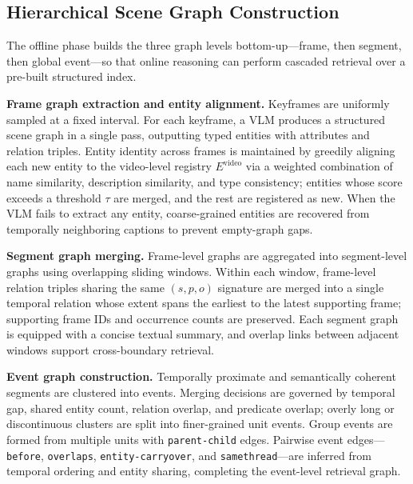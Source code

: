 \documentclass[sigconf, screen, review, anonymous]{acmart}
\begin{document}
\subsection{Hierarchical Scene Graph Construction}
\label{sec:construction}

The offline phase builds the three graph levels bottom-up---frame, then
segment, then global event---so that online reasoning can perform cascaded
retrieval over a pre-built structured index.

\textbf{Frame graph extraction and entity alignment.}\quad
Keyframes are uniformly sampled at a fixed interval.  For each keyframe, a
VLM produces a structured scene graph in a single pass, outputting typed
entities with attributes and relation triples.  Entity identity across
frames is maintained by greedily aligning each new entity to the
video-level registry $E^{\text{video}}$ via a weighted combination of name
similarity, description similarity, and type consistency; entities whose
score exceeds a threshold $\tau$ are merged, and the rest are registered as
new.  When the VLM fails to extract any entity, coarse-grained entities
are recovered from temporally neighboring captions to prevent empty-graph
gaps.

\textbf{Segment graph merging.}\quad
Frame-level graphs are aggregated into segment-level graphs using
overlapping sliding windows.  Within each window, frame-level relation
triples sharing the same $(s, p, o)$ signature are merged into a single
temporal relation whose extent spans the earliest to the latest supporting
frame; supporting frame IDs and occurrence counts are preserved.  Each
segment graph is equipped with a concise textual summary, and overlap links
between adjacent windows support cross-boundary retrieval.

\textbf{Event graph construction.}\quad
Temporally proximate and semantically coherent segments are clustered into
events.  Merging decisions are governed by temporal gap, shared entity
count, relation overlap, and predicate overlap; overly long or
discontinuous clusters are split into finer-grained unit events.  Group
events are formed from multiple units with \texttt{parent-child} edges.
Pairwise event edges---\texttt{before}, \texttt{overlaps},
\texttt{entity-carryover}, and \texttt{same\-thread}---are inferred from
temporal ordering and entity sharing, completing the event-level retrieval
graph.
\end{document}
